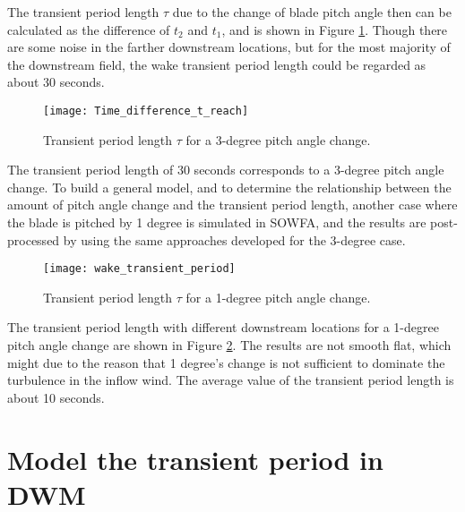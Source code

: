 \documentclass{umthesis}
\begin{document}
The transient period length $\tau$ due to the change of blade pitch angle then can be calculated as the difference of $t_2$ and $t_1$, and is shown in Figure \ref{fig:Time_difference_t_reach}. Though there are some noise in the farther downstream locations, but for the most majority of the downstream field, the wake transient period length could be regarded as about 30 seconds.

\begin{figure}
  \centering
  \texttt{[image: Time\_difference\_t\_reach]}
  \caption{Transient period length $\tau$ for a 3-degree pitch angle change.}\label{fig:Time_difference_t_reach}
\end{figure}

The transient period length of 30 seconds corresponds to a 3-degree pitch angle change. To build a general model, and to determine the relationship between the amount of pitch angle change and the transient period length, another case where the blade is pitched by 1 degree is simulated in SOWFA, and the results are post-processed by using the same approaches developed for the 3-degree case.

\begin{figure}
  \centering
  \texttt{[image: wake\_transient\_period]}
  \caption{Transient period length $\tau$ for a 1-degree pitch angle change.}\label{fig:wake_transient_period}
\end{figure}

The transient period length with different downstream locations for a 1-degree pitch angle change are shown in Figure \ref{fig:wake_transient_period}. The results are not smooth flat, which might due to the reason that 1 degree's change is not sufficient to dominate the turbulence in the inflow wind. The average value of the transient period length is about 10 seconds.



\section{Model the transient period in DWM}\label{sec:DWM_transient}
\end{document}
